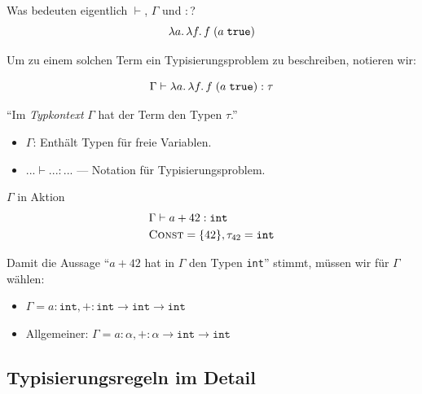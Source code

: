 \documentclass{beamer}
\begin{document}
\begin{frame}{Was bedeuten eigentlich $\vdash$, $\Gamma$ und $:$?}
  \begin{equation*}
    \lambda a.\, \lambda f.\, f\;(a\;\texttt{true})
  \end{equation*}

  Um zu einem solchen Term ein Typisierungsproblem zu beschreiben, notieren wir:

  \begin{equation*}
    \Gamma \vdash \lambda a.\, \lambda f.\, f\;(a\;\texttt{true}) : \tau
  \end{equation*}

  \enquote{Im \emph{Typkontext} $\Gamma$ hat der Term den Typen $\tau$.}

  \begin{itemize}
    \item $\Gamma$: Enthält Typen für freie Variablen.
    \item $... \vdash ... : ...$ --- Notation für Typisierungsproblem.
  \end{itemize}
\end{frame}

\begin{frame}{$\Gamma$ in Aktion}
  \begin{align*}
    &\Gamma \vdash a + 42 : \texttt{int} \\
    &\textsc{Const} = \{ 42 \}, \tau_{42} = \texttt{int}
  \end{align*}

  Damit die Aussage \enquote{$a + 42$ hat in $\Gamma$ den Typen \texttt{int}} stimmt, müssen wir für $\Gamma$ wählen:
  
  \begin{itemize}
    \pause
    \item $\Gamma = a : \texttt{int}, + : \texttt{int} \to \texttt{int} \to \texttt{int}$
    \pause
    \item Allgemeiner: $\Gamma = a : \alpha, + : \alpha \to \texttt{int} \to \texttt{int}$
  \end{itemize}
\end{frame}

\subsection{Typisierungsregeln im Detail}
\end{document}
